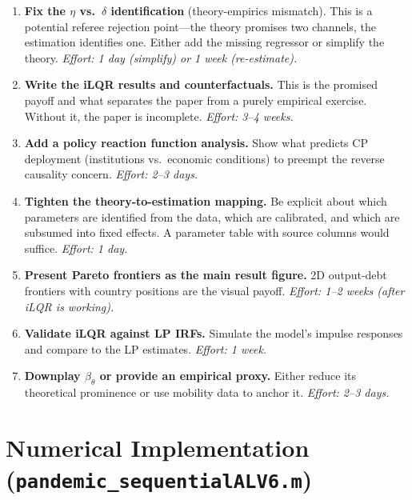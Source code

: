 \documentclass[12pt, a4paper]{article}
\begin{document}
\begin{enumerate}
    \item \textbf{Fix the $\eta$ vs.\ $\delta$ identification} (theory-empirics mismatch). This is a potential referee rejection point---the theory promises two channels, the estimation identifies one. Either add the missing regressor or simplify the theory. \textit{Effort: 1 day (simplify) or 1 week (re-estimate).}

    \item \textbf{Write the iLQR results and counterfactuals.} This is the promised payoff and what separates the paper from a purely empirical exercise. Without it, the paper is incomplete. \textit{Effort: 3--4 weeks.}

    \item \textbf{Add a policy reaction function analysis.} Show what predicts CP deployment (institutions vs.\ economic conditions) to preempt the reverse causality concern. \textit{Effort: 2--3 days.}

    \item \textbf{Tighten the theory-to-estimation mapping.} Be explicit about which parameters are identified from the data, which are calibrated, and which are subsumed into fixed effects. A parameter table with source columns would suffice. \textit{Effort: 1 day.}

    \item \textbf{Present Pareto frontiers as the main result figure.} 2D output-debt frontiers with country positions are the visual payoff. \textit{Effort: 1--2 weeks (after iLQR is working).}

    \item \textbf{Validate iLQR against LP IRFs.} Simulate the model's impulse responses and compare to the LP estimates. \textit{Effort: 1 week.}

    \item \textbf{Downplay $\beta_\theta$ or provide an empirical proxy.} Either reduce its theoretical prominence or use mobility data to anchor it. \textit{Effort: 2--3 days.}
\end{enumerate}


\section{Numerical Implementation (\texttt{pandemic\_sequentialALV6.m})}
\end{document}
